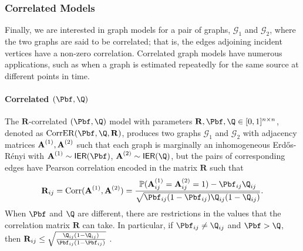 \subsubsection{Correlated Models} \label{sec:correlated-graphs}


Finally, we are interested in graph models for a pair of graphs, $\mathcal{G}_1$ and $\mathcal{G}_2$, where the two graphs are said to be correlated; that is, the edges adjoining incident vertices have a non-zero correlation. Correlated graph models have numerous applications, such as when a graph is estimated repeatedly for the same source at different points in time.

\paragraph{Correlated $(\Pbf,\Q)$}

The $\mathbf{R}$-correlated $(\Pbf, \Q)$ model \cite{lyzinski2017matchability} with parameters $\mathbf{R}, \Pbf, \Q\in[0,1]^{n\times n}$, denoted as $\mathrm{CorrER}(\Pbf, \Q, \mathbf{R})$, produces two graphs $\mathcal{G}_1$ and $\mathcal{G}_2$ with adjacency matrices $\operatorname{\mathbf{A}}^{(1)}, \operatorname{\mathbf{A}}^{(2)}$ such that each graph is marginally an inhomogeneous Erd\H{o}s-R\'enyi with $\A^{(1)} \sim \ier(\Pbf)$, $\A^{(2)}\sim \ier(\Q)$, but the  pairs of corresponding edges have Pearson correlation  encoded in the matrix $\mathbf{R}$ such that 
$$\mathbf{R}_{ij} = \text{Corr}(\A^{(1)}, \A^{(2)})= \frac{\mathbb{P}(\A^{(1)}_{ij}=\A^{(2)}_{ij}=1)-\Pbf_{ij}\Q_{ij}}{\sqrt{\Pbf_{ij}(1-\Pbf_{ij}) \Q_{ij}(1-\Q_{ij})}}.$$
When $\Pbf$ and $\Q$ are different, there are restrictions in the values that the correlation matrix $\mathbf{R}$ can take. In particular, if $\Pbf_{ij}\neq\Q_{ij}$  and $\Pbf>\Q$, then $\mathbf{R}_{ij}\leq \sqrt{\frac{\Q_{ij}(1-\Q_{ij})}{\Pbf_{ij}(1-\Pbf_{ij})}}$ \cite{lyzinski2017matchability}.


